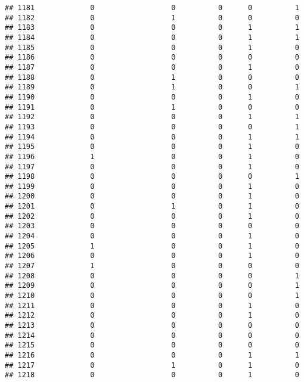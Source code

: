 \documentclass[
]{article}
\begin{document}
\begin{verbatim}
## 1181             0                  0          0      0          1
## 1182             0                  1          0      0          0
## 1183             0                  0          0      1          1
## 1184             0                  0          0      1          1
## 1185             0                  0          0      1          0
## 1186             0                  0          0      0          0
## 1187             0                  0          0      1          0
## 1188             0                  1          0      0          0
## 1189             0                  1          0      0          1
## 1190             0                  0          0      1          0
## 1191             0                  1          0      0          0
## 1192             0                  0          0      1          1
## 1193             0                  0          0      0          1
## 1194             0                  0          0      1          1
## 1195             0                  0          0      1          0
## 1196             1                  0          0      1          0
## 1197             0                  0          0      1          0
## 1198             0                  0          0      0          1
## 1199             0                  0          0      1          0
## 1200             0                  0          0      1          0
## 1201             0                  1          0      1          0
## 1202             0                  0          0      1          0
## 1203             0                  0          0      0          0
## 1204             0                  0          0      1          0
## 1205             1                  0          0      1          0
## 1206             0                  0          0      1          0
## 1207             1                  0          0      0          0
## 1208             0                  0          0      0          1
## 1209             0                  0          0      0          1
## 1210             0                  0          0      0          1
## 1211             0                  0          0      1          0
## 1212             0                  0          0      1          0
## 1213             0                  0          0      0          0
## 1214             0                  0          0      0          0
## 1215             0                  0          0      0          0
## 1216             0                  0          0      1          1
## 1217             0                  1          0      1          0
## 1218             0                  0          0      1          0

\end{verbatim}
\end{document}
